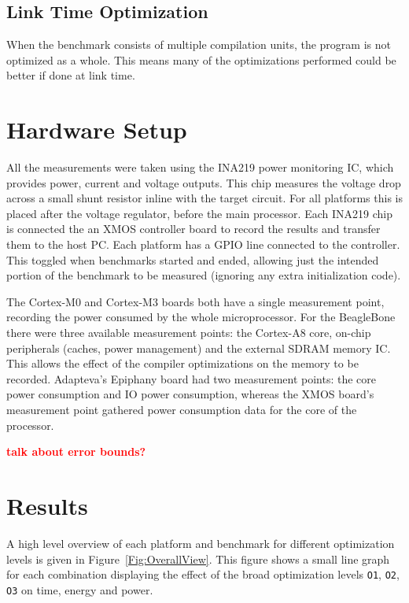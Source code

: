 \documentclass[twocolumn]{article}
\newcommand{\todo}[1]{\textbf{\textcolor{red}{#1}}}
\begin{document}
\subsection*{Link Time Optimization}

When the benchmark consists of multiple compilation units, the program is not optimized as a whole. This means many of the optimizations performed could be better if done at link time.

\section*{Hardware Setup}

All the measurements were taken using the INA219 power monitoring IC\cite{INA219}, which provides power, current and voltage outputs. This chip measures the voltage drop across a small shunt resistor inline with the target circuit. For all platforms this is placed after the voltage regulator, before the main processor. Each INA219 chip is connected the an XMOS controller board to record the results and transfer them to the host PC. Each platform has a GPIO line connected to the controller. This toggled when benchmarks started and ended, allowing just the intended portion of the benchmark to be measured (ignoring any extra initialization code).

The Cortex-M0 and Cortex-M3 boards both have a single measurement point, recording the power consumed by the whole microprocessor. For the BeagleBone there were three available measurement points: the Cortex-A8 core, on-chip peripherals (caches, power management) and the external SDRAM memory IC. This allows the effect of the compiler optimizations on the memory to be recorded. Adapteva's Epiphany board had two measurement points: the core power consumption and IO power consumption, whereas the XMOS board's measurement point gathered power consumption data for the core of the processor.

\todo{talk about error bounds?}


\section*{Results}

A high level overview of each platform and benchmark for different optimization levels is given in Figure~\ref{Fig:OverallView}. This figure shows a small line graph for each combination displaying the effect of the broad optimization levels \texttt{O1}, \texttt{O2}, \texttt{O3} on time, energy and power.
\end{document}
